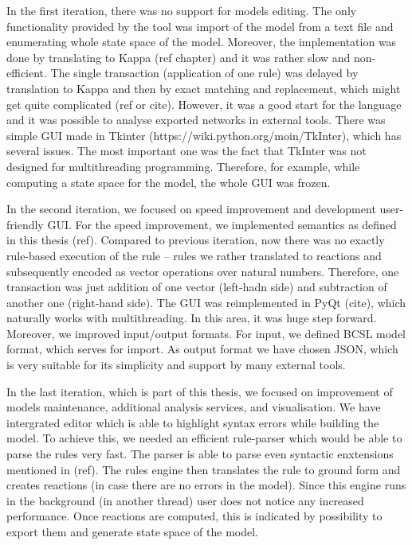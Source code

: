 \documentclass[12pt]{fithesis2}
\begin{document}
In the first iteration, there was no support for models editing. The only functionality provided by the tool was import of the model from a text file and enumerating whole state space of the model. Moreover, the implementation was done by translating to Kappa (ref chapter) and it was rather slow and non-efficient. The single transaction (application of one rule) was delayed by translation to Kappa and then by exact matching and replacement, which might get quite complicated (ref or cite). However, it was a good start for the language and it was possible to analyse exported networks in external tools. There was simple GUI made in Tkinter (https://wiki.python.org/moin/TkInter), which has several issues. The most important one was the fact that TkInter was not designed for multithreading programming. Therefore, for example, while computing a state space for the model, the whole GUI was frozen.

In the second iteration, we focused on speed improvement and development user-friendly GUI. For the speed improvement, we implemented semantics as defined in this thesis (ref). Compared to previous iteration, now there was no exactly rule-based execution of the rule -- rules we rather translated to reactions and subsequently encoded as vector operations over natural numbers. Therefore, one transaction was just addition of one vector (left-hadn side) and subtraction of another one (right-hand side). The GUI was reimplemented in PyQt (cite), which naturally works with multithreading. In this area, it was huge step forward. Moreover, we improved input/output formats. For input, we defined BCSL model format, which serves for import. As output format we have chosen JSON, which is very suitable for its simplicity and support by many external tools.

In the last iteration, which is part of this thesis, we focused on improvement of models maintenance, additional analysis services, and visualisation. We have intergrated editor which is able to highlight syntax errors while building the model. To achieve this, we needed an efficient rule-parser which would be able to parse the rules very fast. The parser is able to parse even syntactic enxtensions mentioned in (ref). The rules engine then translates the rule to ground form and creates reactions (in case there are no errors in the model). Since this engine runs in the background (in another thread) user does not notice any increased performance. Once reactions are computed, this is indicated by possibility to export them and generate state space of the model.
\end{document}
